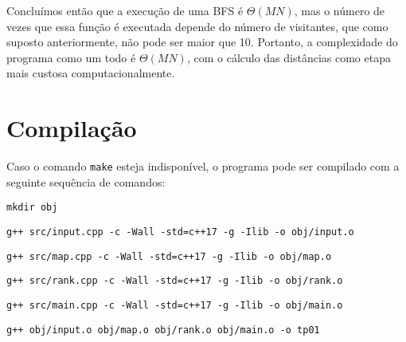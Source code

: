\documentclass{article}
\def\code#1{\texttt{#1}}
\begin{document}
Concluímos então que a execução de uma BFS é \( \Theta(MN) \), mas o número de vezes que essa função é executada depende do número de visitantes, que como suposto anteriormente, não pode ser maior que 10. Portanto, a complexidade do programa como um todo é \( \Theta(MN) \), com o cálculo das distâncias como etapa mais custosa computacionalmente.

\section{Compilação}

Caso o comando \code{make} esteja indisponível, o programa pode ser compilado com a seguinte sequência de comandos:

\texttt{mkdir obj}

\texttt{g++ src/input.cpp -c -Wall -std=c++17 -g -Ilib -o obj/input.o}

\texttt{g++ src/map.cpp -c -Wall -std=c++17 -g -Ilib -o obj/map.o}

\texttt{g++ src/rank.cpp -c -Wall -std=c++17 -g -Ilib -o obj/rank.o}

\texttt{g++ src/main.cpp -c -Wall -std=c++17 -g -Ilib -o obj/main.o}

\texttt{g++ obj/input.o obj/map.o obj/rank.o obj/main.o -o tp01}
\end{document}
